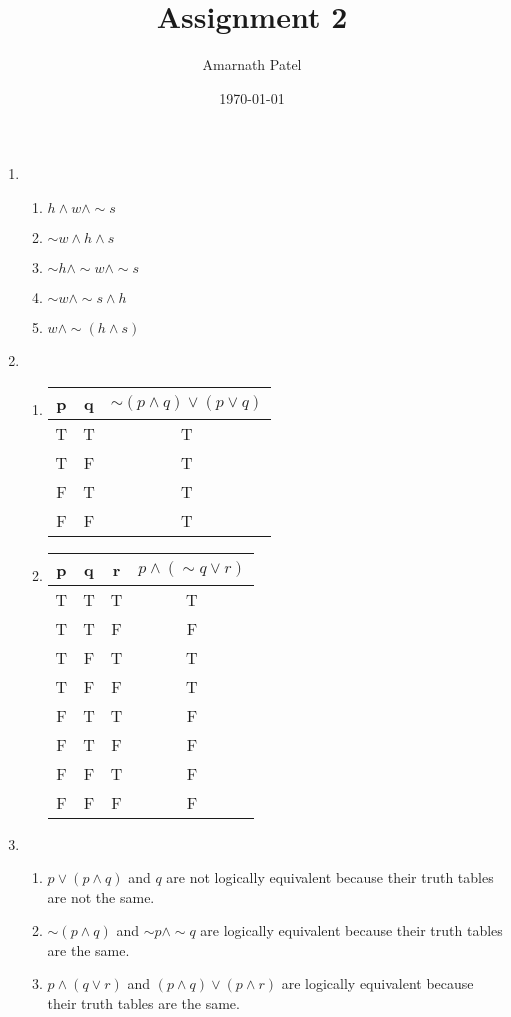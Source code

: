 \documentclass{article}
\title{Assignment 2}
\author{Amarnath Patel}
\date{\today}
\begin{document}
\maketitle
\begin{enumerate}
\item
\begin{enumerate}
\item \(h \land w \land \sim s\)
\item \(\sim w \land h \land s\)
\item \(\sim h \land \sim w \land \sim s\)
\item \(\sim w \land \sim s \land h\)
\item \(w \land \sim (h \land s)\)
\end{enumerate}

\item
\begin{enumerate}
\item 

\begin{tabular}{|c c|c|}
\hline
p & q & \(\sim (p \land q) \lor (p \lor q)\) \\ [0.5ex] 
\hline
T & T & T \\ 
T & F & T \\
F & T & T \\
F & F & T \\
\hline
\end{tabular}

\item 

\begin{tabular}{|c c c|c|}
\hline
p & q & r & \(p \land (\sim q \lor r)\) \\ [0.5ex] 
\hline
T & T & T & T \\ 
T & T & F & F \\
T & F & T & T \\
T & F & F & T \\
F & T & T & F \\
F & T & F & F \\
F & F & T & F \\
F & F & F & F \\
\hline
\end{tabular}

\end{enumerate}

\item
\begin{enumerate}
\item \(p \lor (p \land q)\) and \(q\) are not logically equivalent because their truth tables are not the same.
\item \(\sim (p \land q)\) and \(\sim p \land \sim q\) are logically equivalent because their truth tables are the same.
\item \(p \land (q \lor r)\) and \((p \land q) \lor (p \land r)\) are logically equivalent because their truth tables are the same.
\end{enumerate}


\end{enumerate}
\end{document}
